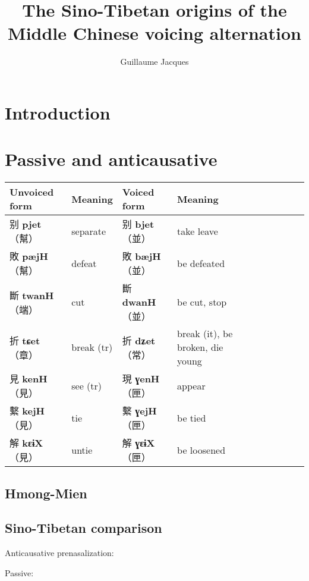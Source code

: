 \documentclass[oneside,a4paper,11pt]{article}
\newcommand{\ipa}[1]{\textbf{{\phon\mbox{#1}}}} %
\newcommand{\zh}[1]{{\cn #1}}
\newcommand{\zhc}[2]{\zh{#1} \ipa{#2}}
\newcommand{\mc}[1]{\zh{（#1）}}
\begin{document}
\title{The Sino-Tibetan origins of the Middle Chinese voicing alternation}
\author{Guillaume Jacques}
\maketitle

 \section*{Introduction}
 \section{Passive and anticausative}
 \citet[86]{zhou62goucibian}
\begin{table}[H]
\begin{tabular}{llllllllll}
\toprule
Unvoiced form &Meaning & Voiced form & Meaning\\
\midrule
\zhc{别}{pjet} \mc{幫}	&separate & \zhc{别}{bjet} \mc{並} & take leave \\
\zhc{敗}{pæjH} \mc{幫}	&defeat & \zhc{敗}{bæjH} \mc{並} & be defeated \\
\midrule
\zhc{斷}{twanH} \mc{端}	&cut & \zhc{斷}{dwanH} \mc{並} & be cut, stop \\
\midrule
\zhc{折}{tɕet} \mc{章}	&break (tr) & \zhc{折}{dʑet} \mc{常} &break (it), be broken, die young \\
\midrule
\zhc{見}{kenH} \mc{見}	&see (tr) & \zhc{現}{ɣenH} \mc{匣} & appear \\
\zhc{繫}{kejH} \mc{見}	&tie & \zhc{繫}{ɣejH} \mc{匣} & be tied \\
\zhc{解}{kɛɨX} \mc{見}	&untie & \zhc{解}{ɣɛɨX} \mc{匣} & be loosened \\
\bottomrule
\end{tabular}
\end{table}

\subsection{Hmong-Mien} 
\citet{downer73loanwords, sagart03prenasalized}

\subsection{Sino-Tibetan comparison} 
Anticausative prenasalization:

\citet{jacques15spontaneous, jacques15causative}

Passive:
\end{document}
